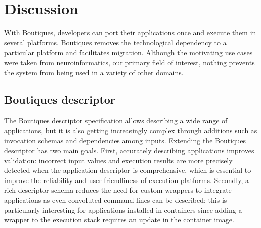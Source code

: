 \documentclass[a4paper,num-refs]{oup-contemporary}
\newcommand{\boutiques}{Boutiques\xspace}
\begin{document}
\section{Discussion}
With \boutiques, developers can port their applications once and execute
them in several platforms. \boutiques removes the technological dependency to a
particular platform and facilitates migration.  Although the
motivating use cases were taken from neuroinformatics, our primary
field of interest, nothing prevents the system from being used in a
variety of other domains.

\subsection{\boutiques descriptor}

The \boutiques descriptor specification allows describing a wide range
of applications, but it is also getting increasingly complex through
additions such as invocation schemas and dependencies among
inputs. Extending the \boutiques descriptor has two main goals. First,
accurately describing applications improves validation: incorrect input
values and execution results are more precisely detected when the
application descriptor is comprehensive, which is essential to improve
the reliability and user-friendliness of execution
platforms. Secondly, a rich descriptor schema reduces the need for
custom wrappers to integrate applications as even convoluted command
lines can be described: this is particularly interesting for
applications installed in containers since adding a wrapper to the
execution stack requires an update in the container image.
\end{document}
